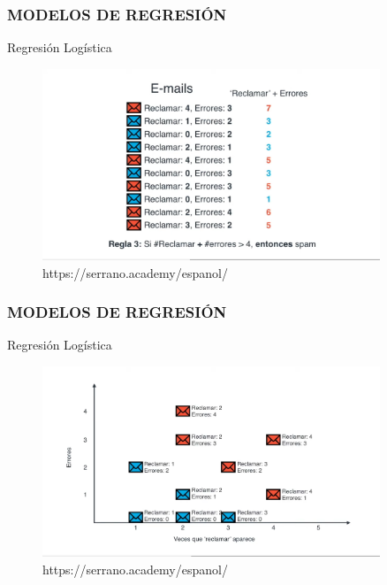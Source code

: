 \documentclass{beamer}
\begin{document}
\begin{frame}
	\frametitle{MODELOS DE REGRESIÓN}
	\begin{block}{Regresión Logística}	
		\begin{figure}
			\includegraphics[width=0.9\textwidth]{Imagenes_reg_log/IMG_3498.jpg}
			\caption{https://serrano.academy/espanol/}
		\end{figure}
	\end{block}
\end{frame}

\begin{frame}
	\frametitle{MODELOS DE REGRESIÓN}
	\begin{block}{Regresión Logística}	
		\begin{figure}
			\includegraphics[width=0.9\textwidth]{Imagenes_reg_log/IMG_3499.jpg}
			\caption{https://serrano.academy/espanol/}
		\end{figure}
	\end{block}
\end{frame}
\end{document}
